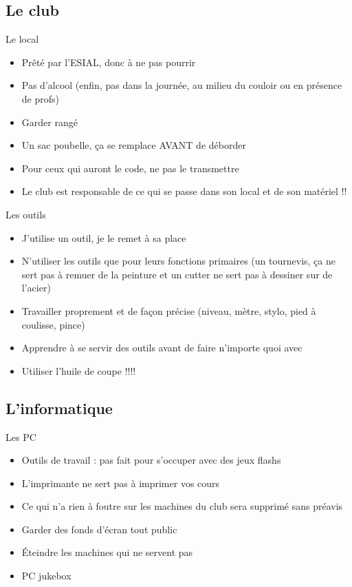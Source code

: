 \documentclass{beamer}
\begin{document}
\subsection{Le club}
\begin{frame}{Le local}
	\begin{itemize}
		\item Prêté par l'ESIAL, donc à ne pas pourrir
		\item Pas d'alcool (enfin, pas dans la journée, au milieu du couloir ou en présence de profs)
		\item Garder rangé
		\item Un sac poubelle, ça se remplace AVANT de déborder
		\item Pour ceux qui auront le code, ne pas le transmettre
		\item Le club est responsable de ce qui se passe dans son local et de son matériel !!
	\end{itemize}
\end{frame}

\begin{frame}{Les outils}
	\begin{itemize}
		\item J'utilise un outil, je le remet à sa place
		\item N'utiliser les outils que pour leurs fonctions primaires (un tournevis, ça ne sert pas à remuer de la peinture et un cutter ne sert pas à dessiner sur de l'acier)
		\item Travailler proprement et de façon précise (niveau, mètre, stylo, pied à coulisse, pince)
		\item Apprendre à se servir des outils avant de faire n'importe quoi avec
		\item Utiliser l'huile de coupe !!!!
	\end{itemize}
\end{frame}

\subsection{L'informatique}
\begin{frame}{Les PC}
	\begin{itemize}
		\item Outils de travail : pas fait pour s'occuper avec des jeux flashs
		\item L'imprimante ne sert pas à imprimer vos cours
		\item Ce qui n'a rien à foutre sur les machines du club sera supprimé sans préavis
		\item Garder des fonds d'écran tout public
		\item \'Eteindre les machines qui ne servent pas
		\item PC jukebox
	\end{itemize}
\end{frame}
\end{document}
